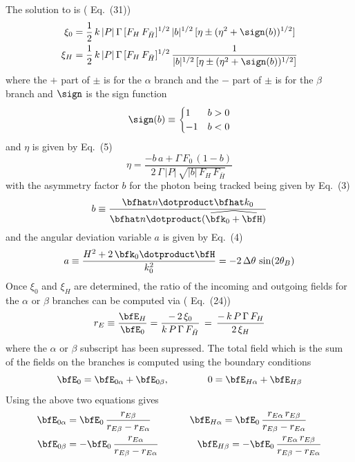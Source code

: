 The solution to  is (\cite{b:batterman} Eq.~(31))
\begin{align}
  \xi_0 &= \frac{1}{2} \, k \, |P| \, \Gamma \, [F_H \, F_{\bar H}]^{1/2} \, 
    |b|^{1/2} \, [\eta \pm (\eta^2 + \sign(b))^{1/2}] \CRNO
  \xi_H &= \frac{1}{2} \, k \, |P| \, \Gamma \, [F_H \, F_{\bar H}]^{1/2} \, 
    \frac{1}{|b|^{1/2} \, [\eta \pm (\eta^2 + \sign(b))^{1/2}]}
\end{align}
where the $+$ part of $\pm$ is for the $\alpha$ branch and the $-$ part of $\pm$ is for the $\beta$
branch and $\sign$ is the sign function
\begin{equation}
  \sign(b) \equiv \begin{cases} 1 & b > 0 \\ -1 & b < 0 \end{cases}
\end{equation}
and $\eta$ is given by \cite{b:blasdell} Eq.~(5)
\begin{equation}
  \eta = \frac{-b \, a + \Gamma \, F_0 \, (1 - b)}{2 \, \Gamma \, |P| \, \sqrt{|b| \, F_H \, F_{\bar H}}}
\end{equation}
with the asymmetry factor $b$ for the photon being tracked being given by \cite{b:blasdell} Eq.~(3)
\begin{equation}
  b \equiv \frac{\bfhat n \dotproduct \bfhat k_0}{\bfhat n \dotproduct (\widehat{{\bfk_0 + \bfH}})}
\end{equation}
and the angular deviation variable $a$ is given by \cite{b:blasdell} Eq.~(4)
\begin{equation}
  a \equiv \frac{H^2 + 2 \, \bfk_0 \dotproduct \bfH}{k_0^2} 
  = -2 \, \Delta \theta \, \sin(2\theta_B)
\end{equation}
Once $\xi_0$ and $\xi_H$ are determined, the ratio of the incoming and outgoing fields for the
$\alpha$ or $\beta$ branches can be computed via (\cite{b:batterman} Eq.~(24))
\begin{equation}
  r_E \equiv \frac{\bfE_H}{\bfE_0} 
  = \frac{- \, 2 \, \xi_0}{k \, P \, \Gamma \, F_{\bar H}} \,
  = \, \frac{- \, k \, P \, \Gamma \, F_H}{2 \, \xi_H} 
\end{equation}
where the $\alpha$ or $\beta$ subscript has been supressed.  The total field which is the sum of the
fields on the branches is computed using the boundary conditions
\begin{equation}
  \bfE_0 = \bfE_{0\alpha} + \bfE_{0\beta}, \qquad\qquad 
  0 = \bfE_{H\alpha} + \bfE_{H\beta}
\end{equation}
Using the above two equations gives
\begin{align}
  \bfE_{0\alpha} &= \bfE_0 \, \frac{r_{E\beta}}{r_{E\beta} - r_{E\alpha}} \qquad\qquad
  \bfE_{H\alpha}  = \bfE_0 \, \frac{r_{E\alpha} \, r_{E\beta}}{r_{E\beta} - r_{E\alpha}} \CRNO
  \bfE_{0\beta} &= -\bfE_0 \, \frac{r_{E\alpha}}{r_{E\beta} - r_{E\alpha}} \qquad\qquad
  \bfE_{H\beta}  = -\bfE_0 \, \frac{r_{E\alpha} \, r_{E\beta}}{r_{E\beta} - r_{E\alpha}} 
\end{align}

